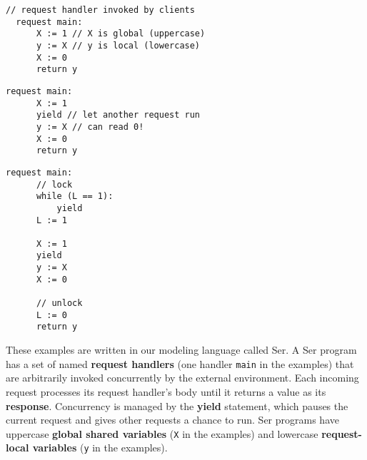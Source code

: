 \noindent
\begin{minipage}[t]{0.55\textwidth}
	\begin{minipage}[t]{\textwidth}
		\begin{lstlisting}[caption={Without yield or lock (serializable)},
			label={lst:MotivatingExample1Ser}]
  // request handler invoked by clients          
  request main: 
      X := 1 // X is global (uppercase)
      y := X // y is local (lowercase)
      X := 0
      return y 
		\end{lstlisting}
	\end{minipage}
	\vspace{1em}
	\begin{minipage}[t]{\textwidth}
		\begin{lstlisting}[caption={With yield (not serializable)},
			label={lst:MotivatingExample2NonSer}]
  request main: 
      X := 1 
      yield // let another request run
      y := X // can read 0!
      X := 0
      return y 	
		\end{lstlisting}
	\end{minipage}
\end{minipage}%
\hfill
\begin{minipage}[t]{0.35\textwidth}
	\begin{lstlisting}[caption={With yield and lock (serializable)},
		label={lst:MotivatingExample3Ser}]
  request main: 
      // lock
      while (L == 1): 
          yield
      L := 1 

      X := 1
      yield
      y := X 
      X := 0

      // unlock    
      L := 0
      return y 
	\end{lstlisting}
\end{minipage}

These examples are written in our modeling language called Ser.
A Ser program has a set of named \textbf{request handlers} (one handler \texttt{main} in the examples) that are arbitrarily invoked concurrently by the external environment.
Each incoming request processes its request handler's body until it returns a value as its \textbf{response}. Concurrency is managed by the \textbf{yield} statement, which pauses the current request and gives other requests a chance to run. Ser programs have uppercase \textbf{global shared variables} (\texttt{X} in the examples) and lowercase \textbf{request-local variables} (\texttt{y} in the examples).



